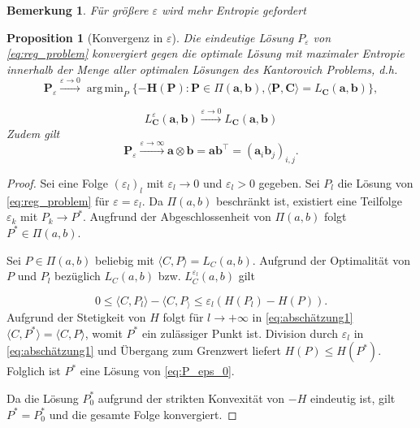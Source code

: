 \documentclass[11pt,a4paper]{article}
\DeclareMathOperator*{\argmin}{arg\,min}
\newtheorem{proposition}[theorem]{Proposition}
\newtheorem{remark}[theorem]{Bemerkung}
\numberwithin{equation}{section}
\begin{document}
	
	
	
	\begin{remark}
		Für größere $\varepsilon$ wird mehr Entropie gefordert
	\end{remark}
	
	\begin{proposition}[Konvergenz in $\varepsilon$]
		Die eindeutige Lösung $P_\varepsilon$ von \autoref{eq:reg_problem} konvergiert gegen die optimale Lösung mit maximaler Entropie innerhalb der Menge aller optimalen Lösungen des Kantorovich Problems, d.h.
		\begin{equation}
		\boldsymbol{P}_\varepsilon \xrightarrow{\varepsilon \to 0} \argmin_{P} \lbrace -\boldsymbol{H}(\boldsymbol{P}) : \boldsymbol{P} \in \Pi (\boldsymbol{a}, \boldsymbol{b}), \langle \boldsymbol{P}, \boldsymbol{C} \rangle = L_{\boldsymbol{C}}(\boldsymbol{a}, \boldsymbol{b}) \rbrace, \label{eq:P_eps_0} 
		\end{equation}
		
	
		\begin{equation}
		L_{\boldsymbol{C}}^\varepsilon (\boldsymbol{a}, \boldsymbol{b}) \xrightarrow{\varepsilon \to 0} L_{\boldsymbol{C}}(\boldsymbol{a}, \boldsymbol{b})
		\end{equation}
		Zudem gilt
		\begin{equation}
		\boldsymbol{P}_\varepsilon \xrightarrow{\varepsilon \to \infty} \boldsymbol{a} \otimes \boldsymbol{b} = \boldsymbol{a} \boldsymbol{b}^\top = (\boldsymbol{a}_i \boldsymbol{b}_j)_{i,j}. \label{eq:P_eps_infty}
		\end{equation}
	\end{proposition}
	
	\begin{proof}
		Sei eine Folge $(\varepsilon_l)_l$ mit $\varepsilon_l \to 0$ und $\varepsilon_l > 0$ gegeben. Sei $P_l$ die Lösung von  \autoref{eq:reg_problem} für $\varepsilon = \varepsilon_l$. Da $\Pi(a,b)$ beschränkt ist, existiert eine Teilfolge $\varepsilon_k$ mit $P_k \to P^*$. Augfrund der Abgeschlossenheit von $\Pi(a,b)$ folgt $P^* \in \Pi(a,b)$.
		
		Sei $P \in \Pi (a,b)$ beliebig mit $\langle C, P \rangle = L_C(a,b)$. Aufgrund der Optimalität von $P$ und $P_l$ bezüglich $L_C(a,b)$ bzw. $L_C^{\varepsilon_l}(a,b)$ gilt
		
		\begin{equation}
		0 \leq \langle C, P_l\rangle - \langle C, P_\rangle \leq \varepsilon_l (H(P_l)-H(P)). \label{eq:abschätzung1}
		\end{equation}
		Aufgrund der Stetigkeit von $H$ folgt für $l \to +\infty$ in \autoref{eq:abschätzung1} $\langle C, P^* \rangle = \langle C, P \rangle$, womit $P^*$ ein zulässiger Punkt ist. Division durch $\varepsilon_l$ in \autoref{eq:abschätzung1} und Übergang zum Grenzwert liefert $H(P)\leq H(P^*)$. Folglich ist $P^*$ eine Lösung von \autoref{eq:P_eps_0}.
		
		Da die Lösung $P_0^*$ aufgrund der strikten Konvexität von $-H$ eindeutig ist, gilt $P^* = P_0^*$ und die gesamte Folge konvergiert.
		
		
	\end{proof}
	
\end{document}
